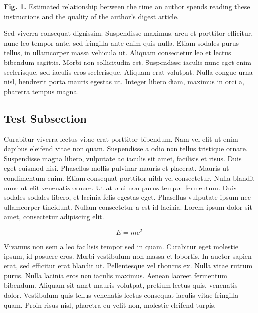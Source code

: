 \documentclass[10pt]{article}
\begin{document}
\begin{multicols}{2}
\label{fig:author-time}

\vspace{3pt}

{\fontsize{9pt}{10pt}\selectfont
\noindent\textbf{Fig. 1.} \hspace{0.5in} Estimated relationship between the time an author spends reading these instructions and the quality of the author's digest article.
}

\vspace{12pt}


Sed viverra consequat dignissim. Suspendisse maximus, arcu et porttitor efficitur, nunc leo tempor ante, sed fringilla ante enim quis nulla. Etiam sodales purus tellus, in ullamcorper massa vehicula ut. Aliquam consectetur leo et lectus bibendum sagittis. Morbi non sollicitudin est. Suspendisse iaculis nunc eget enim scelerisque, sed iaculis eros scelerisque. Aliquam erat volutpat. Nulla congue urna nisl, hendrerit porta mauris egestas ut. Integer libero diam, maximus in orci a, pharetra tempus magna.

\subsection{Test Subsection}
Curabitur viverra lectus vitae erat porttitor bibendum. Nam vel elit ut enim dapibus eleifend vitae non quam. Suspendisse a odio non tellus tristique ornare. Suspendisse magna libero, vulputate ac iaculis sit amet, facilisis et risus. Duis eget euismod nisi. Phasellus mollis pulvinar mauris et placerat. Mauris ut condimentum enim. Etiam consequat porttitor nibh vel consectetur. Nulla blandit nunc ut elit venenatis ornare. Ut at orci non purus tempor fermentum. Duis sodales sodales libero, et lacinia felis egestas eget. Phasellus vulputate ipsum nec ullamcorper tincidunt. Nullam consectetur a est id lacinia. Lorem ipsum dolor sit amet, consectetur adipiscing elit.

\begin{equation}
E = mc^2
\end{equation}

Vivamus non sem a leo facilisis tempor sed in quam. Curabitur eget molestie ipsum, id posuere eros. Morbi vestibulum non massa et lobortis. In auctor sapien erat, sed efficitur erat blandit ut. Pellentesque vel rhoncus ex. Nulla vitae rutrum purus. Nulla lacinia eros non iaculis maximus. Aenean laoreet fermentum bibendum. Aliquam sit amet mauris volutpat, pretium lectus quis, venenatis dolor. Vestibulum quis tellus venenatis lectus consequat iaculis vitae fringilla quam. Proin risus nisl, pharetra eu velit non, molestie eleifend turpis.


\end{multicols}
\end{document}
